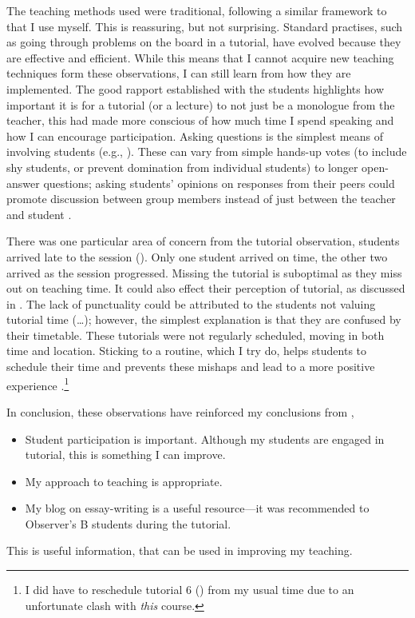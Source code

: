 The teaching methods used were traditional, following a similar framework to that I use myself. This is reassuring, but not surprising. Standard practises, such as going through problems on the board in a tutorial, have evolved because they are effective and efficient. While this means that I cannot acquire new teaching techniques form these observations, I can still learn from how they are implemented. The good rapport established with the students highlights how important it is for a tutorial (or a lecture) to not just be a monologue from the teacher, this had made more conscious of how much time I spend speaking and how I can encourage participation. Asking questions is the simplest means of involving students (e.g., ). These can vary from simple hands-up votes (to include shy students, or prevent domination from individual students) to longer open-answer questions; asking students' opinions on responses from their peers could promote discussion between group members instead of just between the teacher and student \citep[cf.][]{Foster1981}. 

There was one particular area of concern from the tutorial observation, students arrived late to the session (). Only one student arrived on time, the other two arrived as the session progressed. Missing the tutorial is suboptimal as they miss out on teaching time. It could also effect their perception of tutorial, as discussed in . The lack of punctuality could be attributed to the students not valuing tutorial time (\ldots); however, the simplest explanation is that they are confused by their timetable. These tutorials were not regularly scheduled, moving in both time and location. Sticking to a routine, which I try do, helps students to schedule their time and prevents these mishaps and lead to a more positive experience \citep{Zaitseva2013}.\footnote{I did have to reschedule tutorial 6 () from my usual time due to an unfortunate clash with \emph{this} course.}

In conclusion, these observations have reinforced my conclusions from ,
\begin{itemize}
\item Student participation is important. Although my students are engaged in tutorial, this is something I can improve.
\item My approach to teaching is appropriate.
\item My blog on essay-writing is a useful resource---it was recommended to Observer's B students during the tutorial.
\end{itemize}
This is useful information, that can be used in improving my teaching.
